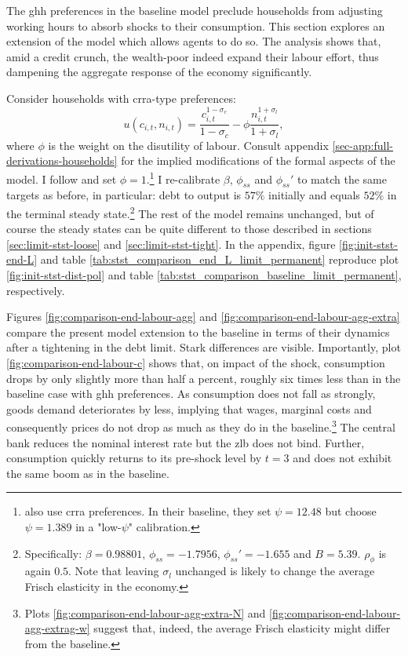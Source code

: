\documentclass[a4paper,12pt]{article} %
\numberwithin{equation}{section} %
\numberwithin{figure}{section}
\numberwithin{table}{section}
\begin{document}
The \Gls{ghh} preferences in the baseline model preclude households from adjusting working hours to absorb shocks to their consumption. This section explores an extension of the model which allows agents to do so. The analysis shows that, amid a credit crunch, the wealth-poor indeed expand their labour effort, thus dampening the aggregate response of the economy significantly.

Consider households with \Gls{crra}-type preferences:
\begin{equation}
    u(c_{i,t}, n_{i,t}) = \frac{c_{i,t}^{1-\sigma_c}}{1-\sigma_c} - \phi \frac{n_{i,t}^{1+\sigma_l}}{1+\sigma_l}, \label{eq:hh-crra-utility}
\end{equation}
where $\phi$ is the weight on the disutility of labour. Consult appendix \ref{sec-app:full-derivations-households} for the implied modifications of the formal aspects of the model. I follow \textcite{mckay2016} and set $\phi=1$.\footnote{\textcite{gl2017} also use \Gls{crra} preferences. In their baseline, they set $\psi = 12.48$ but choose $\psi = 1.389$ in a "low-$\psi$" calibration.} I re-calibrate $\beta$, $\phi_{ss}$ and $\phi_{ss}'$ to match the same targets as before, in particular: debt to output is $57\%$ initially and equals $52\%$ in the terminal steady state.\footnote{Specifically: $\beta = 0.98801$, $\phi_{ss} = -1.7956$, $\phi_{ss}' = -1.655$ and $B = 5.39$. $\rho_{\phi}$ is again $0.5$. Note that leaving $\sigma_l$ unchanged is likely to change the average Frisch elasticity in the economy.} The rest of the model remains unchanged, but of course the steady states can be quite different to those described in sections \ref{sec:limit-stst-loose} and \ref{sec:limit-stst-tight}. In the appendix, figure \ref{fig:init-stst-end-L} and table \ref{tab:stst_comparison_end_L_limit_permanent} reproduce plot \ref{fig:init-stst-dist-pol} and table \ref{tab:stst_comparison_baseline_limit_permanent}, respectively.

Figures \ref{fig:comparison-end-labour-agg} and \ref{fig:comparison-end-labour-agg-extra} compare the present model extension to the baseline in terms of their dynamics after a tightening in the debt limit. Stark differences are visible. Importantly, plot \ref{fig:comparison-end-labour-c} shows that, on impact of the shock, consumption drops by only slightly more than half a percent, roughly six times less than in the baseline case with \Gls{ghh} preferences. As consumption does not fall as strongly, goods demand deteriorates by less, implying that wages, marginal costs and consequently prices do not drop as much as they do in the baseline.\footnote{Plots \ref{fig:comparison-end-labour-agg-extra-N} and \ref{fig:comparison-end-labour-agg-extrag-w} suggest that, indeed, the average Frisch elasticity might differ from the baseline.} The central bank reduces the nominal interest rate but the \Gls{zlb} does not bind. Further, consumption quickly returns to its pre-shock level by $t=3$ and does not exhibit the same boom as in the baseline. 
\end{document}
